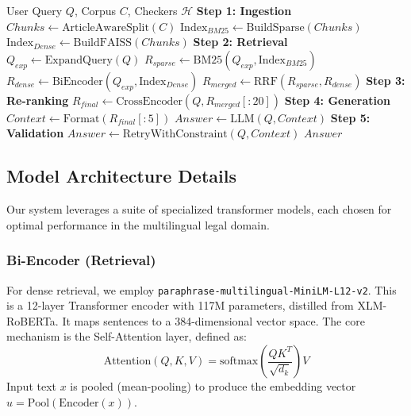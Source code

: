 \documentclass[11pt]{article}
\begin{document}
\begin{algorithm}[h]
\caption{Hybrid RAG Pipeline with Hallucination Guard}
\label{fig:workflow_algo}
\begin{algorithmic}[1]
\REQUIRE User Query $Q$, Corpus $C$, Checkers $\mathcal{H}$
\STATE \textbf{Step 1: Ingestion}
\STATE $Chunks \leftarrow \text{ArticleAwareSplit}(C)$
\STATE $\text{Index}_{BM25} \leftarrow \text{BuildSparse}(Chunks)$
\STATE $\text{Index}_{Dense} \leftarrow \text{BuildFAISS}(Chunks)$
\STATE
\STATE \textbf{Step 2: Retrieval}
\STATE $Q_{exp} \leftarrow \text{ExpandQuery}(Q)$ 
\STATE $R_{sparse} \leftarrow \text{BM25}(Q_{exp}, \text{Index}_{BM25})$
\STATE $R_{dense} \leftarrow \text{BiEncoder}(Q_{exp}, \text{Index}_{Dense})$
\STATE $R_{merged} \leftarrow \text{RRF}(R_{sparse}, R_{dense})$
\STATE
\STATE \textbf{Step 3: Re-ranking}
\STATE $R_{final} \leftarrow \text{CrossEncoder}(Q, R_{merged}[:20])$
\STATE
\STATE \textbf{Step 4: Generation}
\STATE $Context \leftarrow \text{Format}(R_{final}[:5])$
\STATE $Answer \leftarrow \text{LLM}(Q, Context)$
\STATE
\STATE \textbf{Step 5: Validation}
    \STATE $Answer \leftarrow \text{RetryWithConstraint}(Q, Context)$
\ENDIF
\RETURN $Answer$
\end{algorithmic}
\end{algorithm}

\subsection{Model Architecture Details}
Our system leverages a suite of specialized transformer models, each chosen for optimal performance in the multilingual legal domain.

\subsubsection{Bi-Encoder (Retrieval)}
For dense retrieval, we employ \texttt{paraphrase-multilingual-MiniLM-L12-v2}. This is a 12-layer Transformer encoder with 117M parameters, distilled from XLM-RoBERTa. It maps sentences to a 384-dimensional vector space.
The core mechanism is the Self-Attention layer, defined as:
\begin{equation}
    \text{Attention}(Q, K, V) = \text{softmax}\left(\frac{QK^T}{\sqrt{d_k}}\right)V
\end{equation}
Input text $x$ is pooled (mean-pooling) to produce the embedding vector $u = \text{Pool}(\text{Encoder}(x))$.
\end{document}
